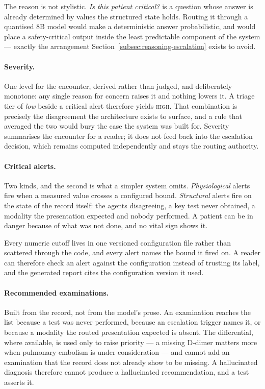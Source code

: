 The reason is not stylistic. \emph{Is this patient critical?} is a question whose answer is
already determined by values the structured state holds. Routing it through a quantised 8B
model would make a deterministic answer probabilistic, and would place a safety-critical
output inside the least predictable component of the system --- exactly the arrangement
Section~\ref{subsec:reasoning-escalation} exists to avoid.

\paragraph{Severity.} One level for the encounter, derived rather than judged, and
deliberately monotone: any single reason for concern raises it and nothing lowers it. A triage
tier of \emph{low} beside a critical alert therefore yields \textsc{high}. That combination is
precisely the disagreement the architecture exists to surface, and a rule that averaged the
two would bury the case the system was built for. Severity summarises the encounter for a
reader; it does not feed back into the escalation decision, which remains computed
independently and stays the routing authority.

\paragraph{Critical alerts.} Two kinds, and the second is what a simpler system omits.
\emph{Physiological} alerts fire when a measured value crosses a configured bound.
\emph{Structural} alerts fire on the state of the record itself: the agents disagreeing, a key
test never obtained, a modality the presentation expected and nobody performed. A patient can
be in danger because of what was not done, and no vital sign shows it.

Every numeric cutoff lives in one versioned configuration file rather than scattered through
the code, and every alert names the bound it fired on. A reader can therefore check an alert
against the configuration instead of trusting its label, and the generated report cites the
configuration version it used.

\paragraph{Recommended examinations.} Built from the record, not from the model's prose. An
examination reaches the list because a test was never performed, because an escalation trigger
names it, or because a modality the routed presentation expected is absent. The differential,
where available, is used only to raise priority --- a missing D-dimer matters more when
pulmonary embolism is under consideration --- and cannot add an examination that the record
does not already show to be missing. A hallucinated diagnosis therefore cannot produce a
hallucinated recommendation, and a test asserts it.

